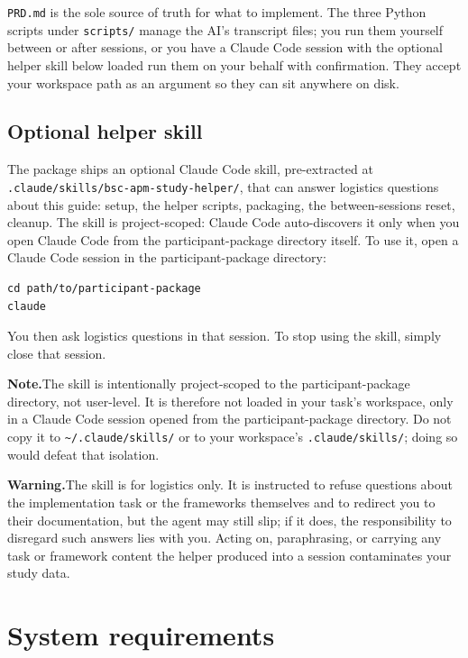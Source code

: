 \documentclass[11pt, a4paper]{article}
\newcommand{\note}[1]{%
    \begin{mdframed}[linecolor=noteborder]
    \textbf{\textcolor{noteborder}{Note.}}\enspace #1
    \end{mdframed}%
}
\newcommand{\warn}[1]{%
    \begin{mdframed}[linecolor=warnborder]
    \textbf{\textcolor{warnborder}{Warning.}}\enspace #1
    \end{mdframed}%
}
\begin{document}
\texttt{PRD.md} is the sole source of truth for what to implement. The three Python scripts under \texttt{scripts/} manage the AI's transcript files; you run them yourself between or after sessions, or you have a Claude Code session with the optional helper skill below loaded run them on your behalf with confirmation. They accept your workspace path as an argument so they can sit anywhere on disk.

\subsection{Optional helper skill}
\label{sec:helperskill}

The package ships an optional Claude Code skill, pre-extracted at \texttt{.claude/skills/bsc-apm-study-helper/}, that can answer logistics questions about this guide: setup, the helper scripts, packaging, the between-sessions reset, cleanup. The skill is project-scoped: Claude Code auto-discovers it only when you open Claude Code from the participant-package directory itself. To use it, open a Claude Code session in the participant-package directory:

\begin{verbatim}
cd path/to/participant-package
claude
\end{verbatim}

You then ask logistics questions in that session. To stop using the skill, simply close that session.

\note{The skill is intentionally project-scoped to the participant-package directory, not user-level. It is therefore not loaded in your task's workspace, only in a Claude Code session opened from the participant-package directory. Do not copy it to \texttt{\textasciitilde/.claude/skills/} or to your workspace's \texttt{.claude/skills/}; doing so would defeat that isolation.}

\warn{The skill is for logistics only. It is instructed to refuse questions about the implementation task or the frameworks themselves and to redirect you to their documentation, but the agent may still slip; if it does, the responsibility to disregard such answers lies with you. Acting on, paraphrasing, or carrying any task or framework content the helper produced into a session contaminates your study data.}

\section{System requirements}
\label{sec:requirements}
\end{document}
